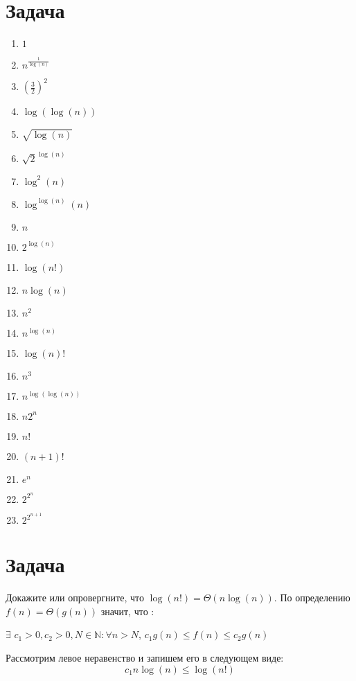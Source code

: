 \documentclass{article}
\begin{document}
\section{Задача }
\begin{multicols}{3}
\begin{enumerate}
\item $1$
\item $n^{\frac{1}{\log(n)}}$
\item $(\frac{3}{2})^{2}$
\item $\log(\log(n))$
\item $\sqrt{\log(n)}$
\item $\sqrt{2}^{\log(n)}$
\item $\log^{2}(n)$
\item $\log^{\log(n)}(n)$
\item $n$
\item $2^{\log(n)}$
\item $\log(n!)$
\item $n\log(n)$
\item $n^{2}$
\item $n^{\log(n)}$
\item $\log(n)!$
\item $n^{3}$
\item $n^{\log(\log(n))}$
\item $n2^{n}$
\item $n!$
\item $(n + 1)!$
\item $e^{n}$
\item $2^{2^{n}}$
\item $2^{2^{n + 1}}$
\end{enumerate}
\end{multicols}

\section{Задача }
Докажите или опровергните, что $\log(n!) = \Theta(n\log(n))$.
\newline
По определению $f(n) = \Theta(g(n))$ значит, что :
\begin{center}
	$\exists$   $c_{1} > 0, c_{2} > 0, N \in \mathbb{N} : \forall n > N$,  $c_{1}g(n) \leq f(n) \leq c_{2}g(n)$
\end{center}
	Рассмотрим левое неравенство и запишем его в следующем виде:
$$c_{1}n\log(n) \leq \log(n!)$$
\end{document}
